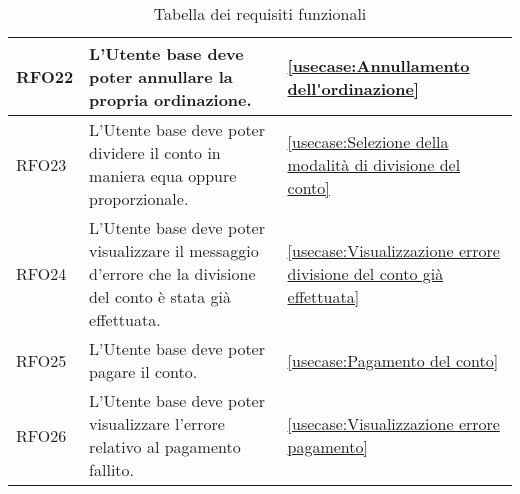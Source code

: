 \begin{table}[H]
\begin{tabularx}{\textwidth}{l|X|p{2cm}}
		\hline
		RFO22       & L'Utente base deve poter annullare la propria ordinazione.                                                     & \autoref{usecase:Annullamento dell'ordinazione}                             \\
		\hline
		RFO23       & L'Utente base deve poter dividere il conto in maniera equa oppure proporzionale.                                                    & \autoref{usecase:Selezione della modalità di divisione del conto}           \\
		\hline
		RFO24       & L'Utente base deve poter visualizzare il messaggio d'errore che la divisione del conto è stata già effettuata. & \autoref{usecase:Visualizzazione errore divisione del conto già effettuata} \\
		\hline
		RFO25       & L'Utente base deve poter pagare il conto.                                                                      & \autoref{usecase:Pagamento del conto}                                       \\
		\hline
		RFO26       & L'Utente base deve poter visualizzare l'errore relativo al pagamento fallito.                                     & \autoref{usecase:Visualizzazione errore pagamento}                                    \\
	\end{tabularx}
	\caption{Tabella dei requisiti funzionali}
\end{table}


